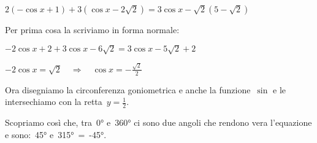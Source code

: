  \begin{esempio}
  \(2 ( -\cos x +1) + 3 (\cos x -2 \sqrt{2}) = 3 \cos x -\sqrt{2} (5 
-\sqrt{2})\)
  
  Per prima cosa la scriviamo in forma normale:
  
  \(- 2 \cos x +2 + 3 \cos x -6 \sqrt{2} = 3 \cos x -5 \sqrt{2} +2\)
  
  \(-2 \cos x  = \sqrt{2} \quad \Rightarrow \quad \cos x  = 
-\frac{\sqrt{2}}{2}\)
  
  Ora disegniamo la circonferenza goniometrica e anche la funzione~\(\sin\) 
  e le intersechiamo con la retta~\(y=\frac{1}{2}\).
  
 \vspace{-6pt}
  \begin{center}
\begin{inaccessibleblock}[Soluzione grafica dell'equazione: 
    \(\cos x = \frac{\sqrt{2}}{2}\).]
    
\end{inaccessibleblock}
  \end{center}
  Scopriamo così che, tra~0° e~360° ci sono due angoli che rendono vera 
  l'equazione e sono:~45° e~315°~=~-45°. 
 \end{esempio}

